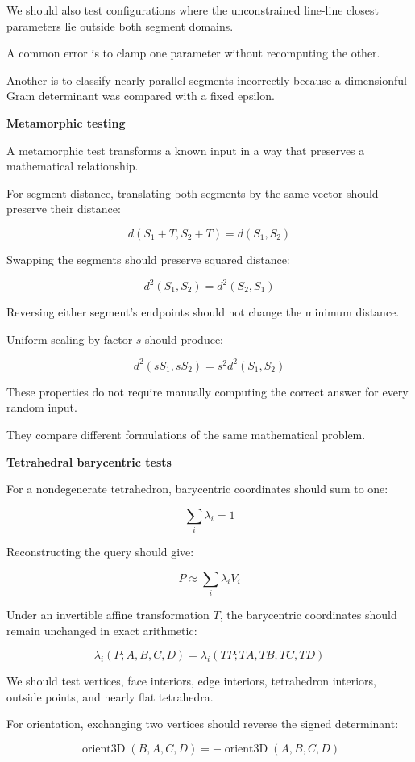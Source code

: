 We should also test configurations where the unconstrained line-line closest parameters lie outside both segment domains.

A common error is to clamp one parameter without recomputing the other.

Another is to classify nearly parallel segments incorrectly because a dimensionful Gram determinant was compared with a fixed epsilon.

\textbf{Metamorphic testing}

A metamorphic test transforms a known input in a way that preserves a mathematical relationship.

For segment distance, translating both segments by the same vector should preserve their distance:

\[
d(S_1+T,S_2+T)=d(S_1,S_2)
\]

Swapping the segments should preserve squared distance:

\[
\boxed{ d^2(S_1,S_2)=d^2(S_2,S_1) }
\]

Reversing either segment's endpoints should not change the minimum distance.

Uniform scaling by factor \(s\) should produce:

\[
\boxed{ d^2(sS_1,sS_2)=s^2d^2(S_1,S_2) }
\]

These properties do not require manually computing the correct answer for every random input.

They compare different formulations of the same mathematical problem.

\textbf{Tetrahedral barycentric tests}

For a nondegenerate tetrahedron, barycentric coordinates should sum to one:

\[
\boxed{ \sum_i\lambda_i=1 }
\]

Reconstructing the query should give:

\[
\boxed{ P\approx\sum_i\lambda_iV_i }
\]

Under an invertible affine transformation \(T\), the barycentric coordinates should remain unchanged in exact arithmetic:

\[
\lambda_i(P;A,B,C,D) = \lambda_i(TP;TA,TB,TC,TD)
\]

We should test vertices, face interiors, edge interiors, tetrahedron interiors, outside points, and nearly flat tetrahedra.

For orientation, exchanging two vertices should reverse the signed determinant:

\[
\operatorname{orient3D}(B,A,C,D) = -\operatorname{orient3D}(A,B,C,D)
\]

